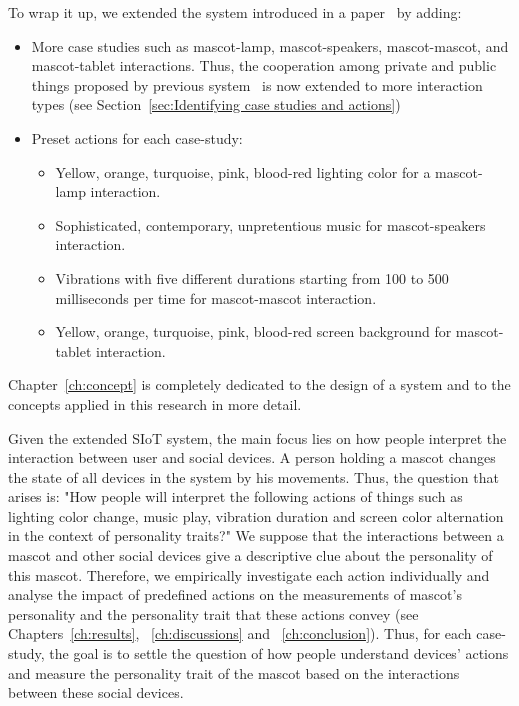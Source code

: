 To wrap it up, we extended the system introduced in a paper~\cite{okada2016autonomous} by adding:
\begin{itemize}
    \item More case studies such as mascot-lamp, mascot-speakers, mascot-mascot, and mascot-tablet interactions.
    Thus, the cooperation among private and public things proposed by previous system~\cite{okada2016autonomous}
    is now extended to more interaction types (see Section~\ref{sec:Identifying case studies and actions})
    \item Preset actions for each case-study:
    \begin{itemize}
        \item Yellow, orange, turquoise, pink, blood-red lighting color for a mascot-lamp interaction.
        \item Sophisticated, contemporary, unpretentious music for mascot-speakers interaction.
        \item Vibrations with five different durations starting from 100 to
        500 milliseconds per time for mascot-mascot interaction.
        \item Yellow, orange, turquoise, pink, blood-red screen background for mascot-tablet interaction.
    \end{itemize}
\end{itemize}
Chapter~\ref{ch:concept} is completely dedicated to the design of a system and to
the concepts applied in this research in more detail.

Given the extended SIoT system, the main focus lies on how people interpret
the interaction between user and social devices.
A person holding a mascot changes the state of all devices in the system by his movements.
Thus, the question that arises is: "How people will interpret the following actions of things such as
lighting color change, music play, vibration duration and screen color
alternation in the context of personality traits?"
We suppose that the interactions between a mascot and other social
devices give a descriptive clue about the personality of this mascot.
Therefore, we empirically investigate each action individually and analyse the impact of predefined
actions on the measurements of mascot's personality and the personality trait
that these actions convey (see Chapters~\ref{ch:results}, ~\ref{ch:discussions} and ~\ref{ch:conclusion}).
Thus, for each case-study, the goal is to settle the question of how people understand devices' actions
and measure the personality trait of the mascot based on the interactions between these social devices.

